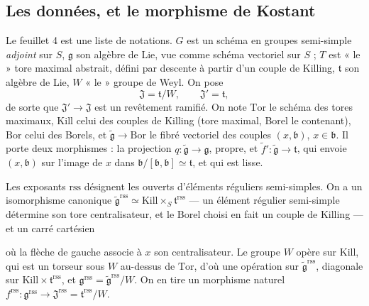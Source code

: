 \documentclass[11pt,a4paper]{article}
\begin{document}
\subsection*{Les données, et le morphisme de Kostant}

Le feuillet 4 est une liste de notations. $G$ est un schéma en groupes
semi-simple \emph{adjoint} sur $S$, $\mathfrak{g}$ son algèbre de Lie, vue
comme schéma vectoriel sur $S$ ; $T$ est « le » tore maximal abstrait, défini
par descente à partir d'un couple de Killing, $\mathfrak{t}$ son algèbre de
Lie, $W$ « le » groupe de Weyl. On pose
\[
  \mathfrak{J}=\mathfrak{t}/W,\qquad \mathfrak{J}'=\mathfrak{t},
\]
de sorte que $\mathfrak{J}'\to\mathfrak{J}$ est un revêtement ramifié. On note
$\mathrm{Tor}$ le schéma des tores maximaux, $\mathrm{Kill}$ celui des couples
de Killing (tore maximal, Borel le contenant), $\mathrm{Bor}$ celui des Borels,
et $\widetilde{\mathfrak{g}}\to\mathrm{Bor}$ le fibré vectoriel des couples
$(x,\mathfrak{b})$, $x\in\mathfrak{b}$. Il porte deux morphismes : la
projection $q\colon\widetilde{\mathfrak{g}}\to\mathfrak{g}$, propre, et
$\tilde f'\colon\widetilde{\mathfrak{g}}\to\mathfrak{t}$, qui envoie
$(x,\mathfrak{b})$ sur l'image de $x$ dans
$\mathfrak{b}/[\mathfrak{b},\mathfrak{b}]\simeq\mathfrak{t}$, et qui est
lisse.

Les exposants $\mathrm{rss}$ désignent les ouverts d'éléments réguliers
semi-simples. On a un isomorphisme canonique
$\widetilde{\mathfrak{g}}^{\mathrm{rss}}\simeq
\mathrm{Kill}\times_{S}\mathfrak{t}^{\mathrm{rss}}$ — un élément régulier
semi-simple détermine son tore centralisateur, et le Borel choisi en fait un
couple de Killing — et un carré cartésien


où la flèche de gauche associe à $x$ son centralisateur. Le groupe $W$ opère
sur $\mathrm{Kill}$, qui est un torseur sous $W$ au-dessus de $\mathrm{Tor}$,
d'où une opération sur $\widetilde{\mathfrak{g}}^{\mathrm{rss}}$, diagonale
sur $\mathrm{Kill}\times\mathfrak{t}^{\mathrm{rss}}$, et
$\mathfrak{g}^{\mathrm{rss}}=\widetilde{\mathfrak{g}}^{\mathrm{rss}}/W$. On en
tire un morphisme naturel
$f^{\mathrm{rss}}\colon\mathfrak{g}^{\mathrm{rss}}\to
\mathfrak{J}^{\mathrm{rss}}=\mathfrak{t}^{\mathrm{rss}}/W$.
\end{document}
